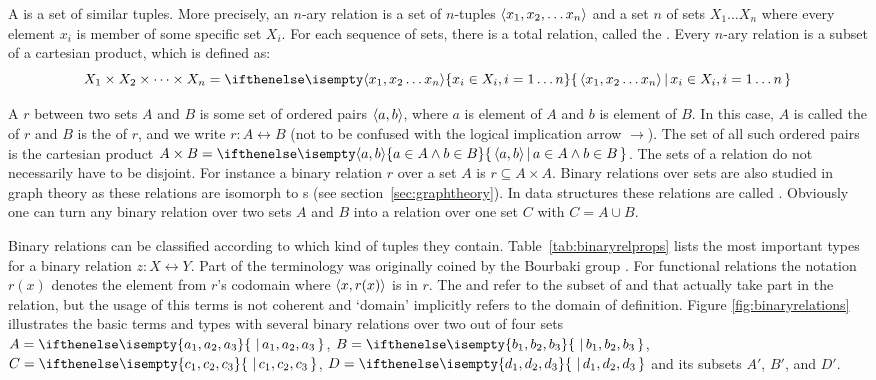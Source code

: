 A  is a set of similar tuples. More precisely, an $n$-ary
relation is a set of $n$-tuples $\langle x_1,x_2,\ldots x_n \rangle$ and a set $n$ of
sets $X_1\ldots X_n$ where every element $x_i$ is member of some specific set
$X_i$. For each sequence of sets, there is a total relation, called the
. Every $n$-ary relation is a subset
of a cartesian product, which is defined as: \[ X_1 \times X_2 \times \cdots
\times X_n = \set[\tuple{x_1,x_2\ldots x_n}]{x_i \in X_i, i=1\ldots n} \]

%
%
%
A  $r$ between two sets $A$ and $B$ is some set of
ordered pairs $\langle a,b \rangle$, where $a$ is element of $A$ and $b$ is element of
$B$. In this case, $A$ is called the  of $r$ and $B$ is the
 of $r$, and we write $r: A \rel B$ (not to be confused with the
logical implication arrow $\to$).  The set of all such ordered pairs is the
cartesian product $A \times B = \set[\tuple{a,b}]{a \in A \wedge b \in B}$. The
sets of a relation do not necessarily have to be disjoint. For instance a
binary relation $r$ over a set $A$ is $r \subseteq A \times A$.  Binary
relations over sets are also studied in graph theory as these relations are
isomorph to s (see section~\ref{sec:graphtheory}). In data
structures these relations are called . Obviously one can turn
any binary relation over two sets $A$ and $B$ into a relation over one set $C$
with $C = A \cup B$.

Binary relations can be classified according to which kind of tuples they
contain. Table~\ref{tab:binaryrelprops} lists the most important types for a
binary relation $z: X \rel Y$. Part of the terminology was originally coined by
the Bourbaki group \cite{Bourbaki1970}. For functional relations the notation
$r(x)$ denotes the element from $r$'s codomain where $\langle x,r(x) \rangle$ is in
$r$.  The  and  refer to the subset of
 and  that actually take part in the relation, but
the usage of this terms is not coherent and `domain' implicitly refers to the
domain of definition.  Figure \ref{fig:binaryrelations} illustrates the basic
terms and types with several binary relations over two out of four sets
$A=\set{a_1,a_2,a_3}$, $B=\set{b_1,b_2,b_3}$, $C=\set{c_1,c_2,c_3}$,
$D=\set{d_1,d_2,d_3}$ and its subsets $A'$, $B'$, and $D'$.  


